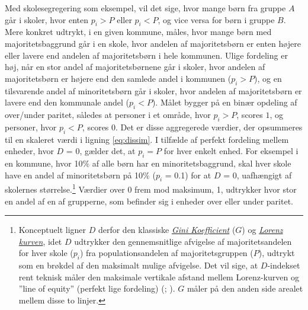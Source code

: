 \documentclass[
]{book}
\begin{document}
Med skolesegregering som eksempel, vil det sige, hvor mange børn fra gruppe \(A\) går i skoler, hvor enten \(p_{i}>P\) eller \(p_{i}<P\), og vice versa for børn i gruppe \(B\). Mere konkret udtrykt, i en given kommune, måles, hvor mange børn med majoritetsbaggrund går i en skole, hvor andelen af majoritetsbørn er enten højere eller lavere end andelen af majoritetsbørn i hele kommunen. Ulige fordeling er høj, når en stor andel af majoritetsbørnene går i skoler, hvor andelen af majoritetsbørn er højere end den samlede andel i kommunen (\(p_{i} > P\)), og en tilsvarende andel af minoritetsbørn går i skoler, hvor andelen af majoritetsbørn er lavere end den kommunale andel (\(p_{i} < P\)). Målet bygger på en binær opdeling af over/under paritet, således at personer i et område, hvor \(p_{i}>P\), scores \(1\), og personer, hvor \(p_{i}<P\), scores 0. Det er disse aggregerede værdier, der opsummeres til en skaleret værdi i ligning \eqref{eq:dissim}. I tilfælde af perfekt fordeling mellem enheder, hvor \(D\) = 0, gælder det, at \(p_{i}=P\) for hver enkelt enhed. For eksempel i en kommune, hvor 10\% af alle børn har en minoritetsbaggrund, skal hver skole have en andel af minoritetsbørn på 10\% (\(p_{i}\) = 0.1) for at \(D\) = 0, uafhængigt af skolernes størrelse.\footnote{Konceptuelt ligner \(D\) derfor den klassiske \href{https://da.wikipedia.org/wiki/Gini-koefficient}{\emph{Gini Koefficient}} (\(G\)) og \href{https://da.wikipedia.org/wiki/Lorenz-kurve}{\emph{Lorenz kurven}}, idet \(D\) udtrykker den gennemsnitlige afvigelse af majoritetsandelen for hver skole (\(p_{i}\)) fra populationsandelen af majoritetsgruppen (\(P\)), udtrykt som en brøkdel af den maksimalt mulige afvigelse. Det vil sige, at \(D\)-indekset rent teknisk måler den maksimale vertikale afstand mellem Lorenz-kurven og ''line of equity'' (perfekt lige fordeling) (; ). \(G\) måler på den anden side arealet mellem disse to linjer.} Værdier over 0 frem mod maksimum, 1, udtrykker hvor stor en andel af en af grupperne, som befinder sig i enheder over eller under paritet.
\end{document}
